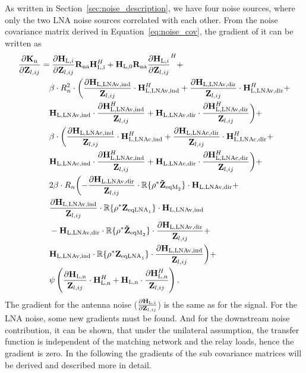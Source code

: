As written in Section~\ref{sec:noise_description}, we have four noise sources, where only the two LNA noise sources correlated with each other.
From the noise covariance matrix derived in Equation~\eqref{eq:noise_cov}, the gradient of it can be written as
\begin{align}
\label{eq:noise_grad}\nonumber
\frac{\partial\mathbf{K}_\text{n}}{\partial\mathbf{Z}_{l,ij}} &= 
\frac{\partial\mathbf{H}_{\text{L,}i}}{\partial\mathbf{Z}_{l,ij}}
	\mathbf{R}_\text{na}\mathbf{H}_\text{\text{L,}i}^H +
	\mathbf{H}_\text{L,0}\mathbf{R}_\text{na}
	\frac{\partial \mathbf{H}_{\text{L,}i}}{\partial\mathbf{Z}_{l,ij}}^H+\\\nonumber
&\quad	\beta \cdot R_n^2\cdot\biggl(
	\frac{\partial \mathbf{H}_\text{L,LNAv,ind}}{\mathbf{Z}_{l,ij}}\cdot
	\mathbf{H}_\text{L,LNAv,ind}^H+
	\frac{\partial \mathbf{H}_\text{L,LNAv,dir}}{\mathbf{Z}_{l,ij}}\cdot
	\mathbf{H}_\text{L,LNAv,dir}^H + \\\nonumber
&\quad	\mathbf{H}_\text{L,LNAv,ind}\cdot
	\frac{\partial\mathbf{H}_\text{L,LNAv,ind}^H}{\mathbf{Z}_{l,ij}} +
	\mathbf{H}_\text{L,LNAv,dir}\cdot
	\frac{\partial\mathbf{H}_\text{L,LNAv,dir}^H}{\mathbf{Z}_{l,ij}}
	\biggr)+\\\nonumber
&\quad	\beta \cdot \biggl(
	\frac{\partial\mathbf{H}_\text{L,LNAc,ind}}{\mathbf{Z}_{l,ij}}\cdot
	\mathbf{H}_\text{L,LNAc,ind}^H+
	\frac{\partial\mathbf{H}_\text{L,LNAc,dir}}{\mathbf{Z}_{l,ij}}\cdot
	\mathbf{H}_\text{L,LNAc,dir}^H+\\\nonumber
&\quad	\mathbf{H}_\text{L,LNAc,ind}\cdot
	\frac{\partial\mathbf{H}_\text{L,LNAc,ind}^H}{\mathbf{Z}_{l,ij}}+
	\mathbf{H}_\text{L,LNAc,dir}\cdot
	\frac{\partial\mathbf{H}_\text{L,LNAc,dir}^H}{\mathbf{Z}_{l,ij}}
	\biggr)+\\\nonumber
&\quad	2\beta \cdot R_n\biggl(
	-\frac{\partial\mathbf{H}_\text{L,LNAv,dir}}{\mathbf{Z}_{l,ij}} \cdot
	\mathbb{R}\{\rho^*\mathbf{\tilde{Z}}_{\text{eqM}_2}\}\cdot
	\mathbf{H}_\text{L,LNAv,dir}+\\\nonumber
&\quad	\frac{\partial\mathbf{H}_\text{L,LNAv,ind}}{\mathbf{Z}_{l,ij}} \cdot
	\mathbb{R}\{\rho^*\mathbf{Z}_{\text{eqLNA}_1}\}\cdot
	\mathbf{H}_\text{L,LNAv,ind}\\\nonumber
&\quad	-\mathbf{H}_\text{L,LNAv,dir} \cdot
	\mathbb{R}\{\rho^*\mathbf{\tilde{Z}}_{\text{eqM}_2}\}\cdot
	\frac{\partial\mathbf{H}_\text{L,LNAv,dir}}{\mathbf{Z}_{l,ij}}+\\\nonumber
&\quad	\mathbf{H}_\text{L,LNAv,ind} \cdot
	\mathbb{R}\{\rho^*\mathbf{Z}_{\text{eqLNA}_1}\}\cdot
	\frac{\partial\mathbf{H}_\text{L,LNAv,ind}}{\mathbf{Z}_{l,ij}}
	\biggr)+\\
&\quad	\psi\left(
	\frac{\partial\mathbf{H}_\text{L,n}}{\mathbf{Z}_{l,ij}} \cdot \mathbf{H}_\text{L,n}^H+
	\mathbf{H}_\text{L,n}\cdot\frac{\partial\mathbf{H}_\text{L,n}^H}{\mathbf{Z}_{l,ij}}
	\right).
\end{align}
The gradient for the antenna noise ($\frac{\partial\mathbf{H}_{\text{L,}i}}{\partial\mathbf{Z}_{l,ij}}$) is the same as for the signal.
For the LNA noise, some new gradients must be found.
And for the downstream noise contribution, it can be shown, that under the unilateral assumption, the transfer function is independent of the matching network and the relay loads, hence the gradient is zero.
In the following the gradients of the sub covariance matrices will be derived and described more in detail.


